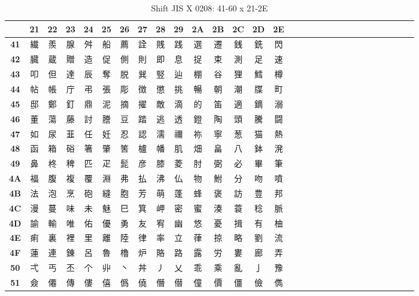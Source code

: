 \begin{table}[H]
\centering
\caption{Shift JIS X 0208: 41-60 x 21-2E}
\begin{tabular}{|Sc|Sc|Sc|Sc|Sc|Sc|Sc|Sc|Sc|Sc|Sc|Sc|Sc|Sc|Sc|}
\hline
 & \textbf{21} & \textbf{22} & \textbf{23} & \textbf{24} & \textbf{25} & \textbf{26} & \textbf{27} & \textbf{28} & \textbf{29} & \textbf{2A} & \textbf{2B} & \textbf{2C} & \textbf{2D} & \textbf{2E} \\ \hline
\textbf{41} & 繊 & 羨 & 腺 & 舛 & 船 & 薦 & 詮 & 賎 & 践 & 選 & 遷 & 銭 & 銑 & 閃 \\ \hline
\textbf{42} & 臓 & 蔵 & 贈 & 造 & 促 & 側 & 則 & 即 & 息 & 捉 & 束 & 測 & 足 & 速 \\ \hline
\textbf{43} & 叩 & 但 & 達 & 辰 & 奪 & 脱 & 巽 & 竪 & 辿 & 棚 & 谷 & 狸 & 鱈 & 樽 \\ \hline
\textbf{44} & 帖 & 帳 & 庁 & 弔 & 張 & 彫 & 徴 & 懲 & 挑 & 暢 & 朝 & 潮 & 牒 & 町 \\ \hline
\textbf{45} & 邸 & 鄭 & 釘 & 鼎 & 泥 & 摘 & 擢 & 敵 & 滴 & 的 & 笛 & 適 & 鏑 & 溺 \\ \hline
\textbf{46} & 董 & 蕩 & 藤 & 討 & 謄 & 豆 & 踏 & 逃 & 透 & 鐙 & 陶 & 頭 & 騰 & 闘 \\ \hline
\textbf{47} & 如 & 尿 & 韮 & 任 & 妊 & 忍 & 認 & 濡 & 禰 & 祢 & 寧 & 葱 & 猫 & 熱 \\ \hline
\textbf{48} & 函 & 箱 & 硲 & 箸 & 肇 & 筈 & 櫨 & 幡 & 肌 & 畑 & 畠 & 八 & 鉢 & 溌 \\ \hline
\textbf{49} & 鼻 & 柊 & 稗 & 匹 & 疋 & 髭 & 彦 & 膝 & 菱 & 肘 & 弼 & 必 & 畢 & 筆 \\ \hline
\textbf{4A} & 福 & 腹 & 複 & 覆 & 淵 & 弗 & 払 & 沸 & 仏 & 物 & 鮒 & 分 & 吻 & 噴 \\ \hline
\textbf{4B} & 法 & 泡 & 烹 & 砲 & 縫 & 胞 & 芳 & 萌 & 蓬 & 蜂 & 褒 & 訪 & 豊 & 邦 \\ \hline
\textbf{4C} & 漫 & 蔓 & 味 & 未 & 魅 & 巳 & 箕 & 岬 & 密 & 蜜 & 湊 & 蓑 & 稔 & 脈 \\ \hline
\textbf{4D} & 諭 & 輸 & 唯 & 佑 & 優 & 勇 & 友 & 宥 & 幽 & 悠 & 憂 & 揖 & 有 & 柚 \\ \hline
\textbf{4E} & 痢 & 裏 & 裡 & 里 & 離 & 陸 & 律 & 率 & 立 & 葎 & 掠 & 略 & 劉 & 流 \\ \hline
\textbf{4F} & 蓮 & 連 & 錬 & 呂 & 魯 & 櫓 & 炉 & 賂 & 路 & 露 & 労 & 婁 & 廊 & 弄 \\ \hline
\textbf{50} & 弌 & 丐 & 丕 & 个 & 丱 & 丶 & 丼 & 丿 & 乂 & 乖 & 乘 & 亂 & 亅 & 豫 \\ \hline
\textbf{51} & 僉 & 僊 & 傳 & 僂 & 僖 & 僞 & 僥 & 僭 & 僣 & 僮 & 價 & 僵 & 儉 & 儁 \\ \hline

\end{tabular}
\end{table}
